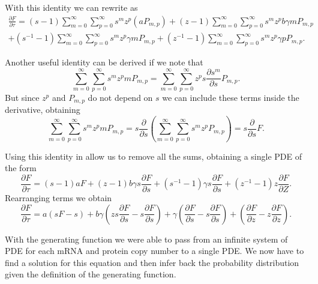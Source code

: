 With this identity we can rewrite  as
\begin{equation}
\begin{aligned}
\frac{\partial F}{\partial \tau} =
(s - 1) \sum_{m=0}^{\infty} \sum_{p=0}^{\infty} s^m z^p \left( a P_{m,p} \right)
+ (z - 1) \sum_{m=0}^{\infty} \sum_{p=0}^{\infty} s^m z^p b \gamma m P_{m,p}
\\
+ \left( s^{-1} - 1 \right) \sum_{m=0}^{\infty} \sum_{p=0}^{\infty} s^m z^p
\gamma m P_{m,p}
+ \left( z^{-1} - 1 \right) \sum_{m=0}^{\infty} \sum_{p=0}^{\infty} s^m z^p
\gamma p P_{m,p}.
\end{aligned}
\label{eq_dF_dtau_identity}
\end{equation}

Another useful identity can be derived if we note that
\begin{equation}
\sum_{m=0}^{\infty} \sum_{p=0}^{\infty} s^m z^p m P_{m, p} =
\sum_{m=0}^{\infty} \sum_{p=0}^{\infty} z^p s \frac{\partial s^m}{\partial s}
P_{m, p}.
\end{equation}
But since $z^p$ and $P_{m, p}$ do not depend on $s$ we can include these terms
inside the derivative, obtaining
\begin{equation}
\sum_{m=0}^{\infty} \sum_{p=0}^{\infty} s^m z^p m P_{m, p} =
s \frac{\partial}{\partial s}\left( \sum_{m=0}^{\infty} \sum_{p=0}^{\infty} s^m z^p P_{m, p} \right) =
s \frac{\partial}{\partial s}F.
\end{equation}

Using this identity in  allow us to remove all the
sums, obtaining a single PDE of the form
\begin{equation}
\frac{\partial F}{\partial \tau} =
(s - 1) a F + (z - 1) b \gamma s \frac{\partial F}{\partial s}
+ \left( s^{-1} - 1 \right) \gamma s \frac{\partial F}{\partial s}
+ \left( z^{-1} - 1 \right) z \frac{\partial F}{\partial Z}.
\end{equation}
Rearranging terms we obtain
\begin{equation}
\frac{\partial F}{\partial \tau} =
a (sF - s)
+ b \gamma \left( z s \frac{\partial F}{\partial s} - s \frac{\partial
F}{\partial s} \right)
+ \gamma \left( \frac{\partial F}{\partial s} - s \frac{\partial F}{\partial s}
\right)
+ \left( \frac{\partial F}{\partial z} - z \frac{\partial F}{\partial z}
\right).
\label{eq_df_dtau_PDE}
\end{equation}

With the generating function we were able to pass from an infinite system of PDE
for each mRNA and protein copy number to a single PDE. We now have to find a
solution for this equation and then infer back the probability distribution
given the definition of the generating function.

